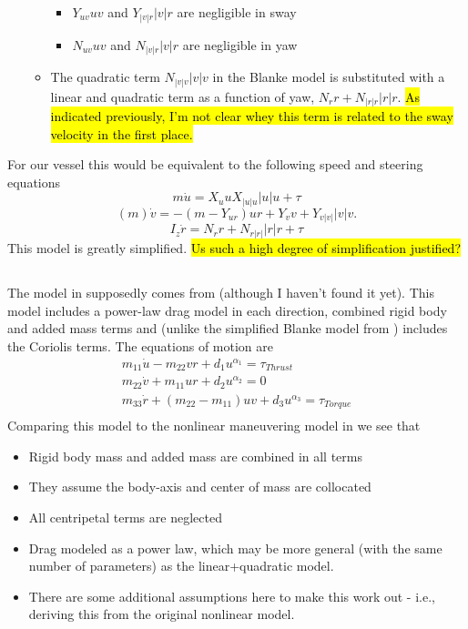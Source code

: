 \documentclass[11pt,draftcls,journal,onecolumn]{IEEEtran}
\begin{document}
\begin{itemize}
\begin{itemize}
    \begin{itemize}
    \item $Y_{uv}uv$ and $Y_{|v|r}|v|r$ are negligible in sway
    \item $N_{uv}uv$ and $N_{|v|r}|v|r$ are negligible in yaw
    \end{itemize}
   \item The quadratic term $N_{|v|v}|v|v$ in the Blanke model is substituted with a linear and quadratic term as a function of yaw, $N_r r+N_{|r|r}|r|r$. \hl{As indicated previously, I'm not clear whey this term is related to the sway velocity in the first place.}
  \end{itemize}
\end{itemize}
For our vessel this would be equivalent to the following speed and steering equations
\begin{equation}
m\dot{u} = X_u u X_{|u|u}|u|u + \tau
\end{equation}
\begin{equation}
(m) \dot{v}
=
-(m -Y_{ur})ur + Y_v v + Y_{v|v|}|v|v .
\label{e:blanke2v}
\end{equation}
\begin{equation}
I_z\dot{r}
=
 N_r r + N_{r|r|}|r|r + \tau
\label{e:blanke2r}
\end{equation}
This model is greatly simplified. \hl{Us such a high degree of simplification justified?}

\subsection{\cite{muske08identification}}
The model in \cite{muske08identification} supposedly comes from  \cite{fossen94guidance} (although I haven't found it yet).  This model includes a power-law drag model in each direction, combined rigid body and added mass terms and (unlike the simplified Blanke model from \cite{caccia08practical}) includes the Coriolis terms.  The equations of motion are
\begin{eqnarray}
m_{11}\dot{u} - m_{22}vr + d_1 u^{\alpha_1} = \tau_{Thrust} \\
m_{22}\dot{v} +  m_{11}ur + d_2 u^{\alpha_2} = 0\\
m_{33}\dot{r} + (m_{22}-m_{11})uv + d_3 u^{\alpha_3} = \tau_{Torque} \\
\end{eqnarray}
Comparing this model to the nonlinear maneuvering model in    we see that
\begin{itemize}
\item Rigid body mass and added mass are combined in all terms
\item They assume the body-axis and center of mass are collocated
\item All centripetal terms are neglected
\item Drag modeled as a power law, which may be more general (with the same number of parameters) as the linear+quadratic model.
\item There are some additional assumptions here to make this work out - i.e., deriving this from the original nonlinear model.
\end{itemize}
\end{document}
